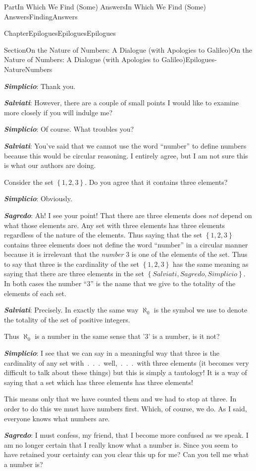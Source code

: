 \documentclass[oneside,10pt,]{book}
\newcommand{\alert}[1]{\textbf{\textit{#1}}}
\numberwithin{equation}{part}
\begin{document}
\begin{partptx}{Part}{In Which We Find (Some) Answers}{}{In Which We Find (Some) Answers}{}{}{FindingAnswers}
\begin{chapterptx}{Chapter}{Epilogues}{}{Epilogues}{}{}{Epilogues}
\begin{sectionptx}{Section}{On the Nature of Numbers: A Dialogue (with Apologies to Galileo)}{}{On the Nature of Numbers: A Dialogue (with Apologies to Galileo)}{}{}{Epilogues-NatureNumbers}
\begin{introduction}{}
\alert{Simplicio}: Thank you.%
\par
\alert{Salviati}:  However, there are a couple of small points I would like to examine more closely if you will indulge me?%
\par
\alert{Simplicio}: Of course. What troubles you?%
\par
\alert{Salviati}: You've said that we cannot use the word ``number'' to define numbers because this would be circular reasoning. I entirely agree, but I am not sure this is what our authors are doing.%
\par
Consider the set \(\left\{1, 2, 3\right\}\). Do you agree that it contains three elements?%
\par
\alert{Simplicio}: Obviously.%
\par
\alert{Sagredo}: Ah!  I see your point!  That there are three elements does \emph{not} depend on what those elements are.  Any set with three elements has three elements regardless of the nature of the elements.  Thus saying that the set \(\left\{1, 2, 3\right\}\) contains three elements does not define the word ``number'' in a circular manner because it is irrelevant that the \emph{number} 3 is one of the elements of the set.  Thus to say that three is the cardinality of the set \(\left\{1, 2, 3\right\}\) has the same meaning as saying that there are three elements in the set \(\left\{Salviati, Sagredo, Simplicio\right\}\).  In both cases the number ``\(3\)'' is the name that we give to the totality of the elements of each set.%
\par
\alert{Salviati}:  Precisely. In exactly the same way \(\aleph_0\) is the symbol we use to denote the totality of the set of positive integers.%
\par
Thus \(\aleph_0\) is a number in the same sense that '\(3\)' is a number, is it not?%
\par
\alert{Simplicio}:  I see that we can say in a meaningful way that three is the cardinality of any set with~.~.~.~well,~.~.~.~with three elements (it becomes very difficult to talk about these things) but this is simply a tautology! It is a way of saying that a set which has three elements has three elements!%
\par
This means only that we have counted them and we had to stop at three. In order to do this we must have numbers first. Which, of course, we do. As I said, everyone knows what numbers are.%
\par
\alert{Sagredo}:  I must confess, my friend, that I become more confused as we speak. I am no longer certain that I really know what a number is. Since you seem to have retained your certainty can you clear this up for me? Can you tell me what a number is?%

\end{introduction}
\end{sectionptx}
\end{chapterptx}
\end{partptx}
\end{document}
